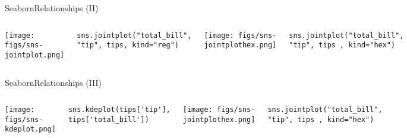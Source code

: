 \documentclass[10pt,compress]{beamer} %
\begin{document}
\begin{frame}[fragile]{Seaborn}{Relationships (II)}
	\begin{columns}[t]
	\texttt{[image: figs/sns-jointplot.png]}\\
	\begin{exampleblock}{}
	\vspace{-0.2cm} 
	\begin{lstlisting}[basicstyle=\tiny]
	sns.jointplot("total_bill", "tip", tips, kind="reg")
	\end{lstlisting}
	\vspace{-0.2cm} 
	\end{exampleblock}

	\texttt{[image: figs/sns-jointplothex.png]}\\
	\begin{exampleblock}{}
	\vspace{-0.2cm} 
	\begin{lstlisting}[basicstyle=\tiny]
	sns.jointplot("total_bill", "tip", tips , kind="hex")
	\end{lstlisting}
	\vspace{-0.2cm} 
	\end{exampleblock}

	\end{columns}
\end{frame}

\begin{frame}[fragile]{Seaborn}{Relationships (III)}
	\begin{columns}
	\texttt{[image: figs/sns-kdeplot.png]}\\
	\begin{exampleblock}{}
	\vspace{-0.2cm} 
	\begin{lstlisting}[basicstyle=\tiny]
	sns.kdeplot(tips['tip'], tips['total_bill'])
	\end{lstlisting}
	\vspace{-0.2cm} 
	\end{exampleblock}

	\texttt{[image: figs/sns-jointplothex.png]}\\
	\begin{exampleblock}{}
	\vspace{-0.2cm} 
	\begin{lstlisting}[basicstyle=\tiny]
	sns.jointplot("total_bill", "tip", tips , kind="hex")
	\end{lstlisting}
	\vspace{-0.2cm} 
	\end{exampleblock}

	\end{columns}
\end{frame}
\end{document}
